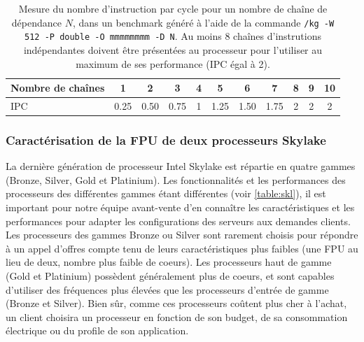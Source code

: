     \begin{table}[h!]
    \centering
    \normalsize
    \begin{tabular}{|l|c|c|c|c|c|c|c|c|c|c|}
    \hline
    Nombre de chaînes & 1 & 2 & 3 & 4 & 5 & 6 & 7 & 8 & 9 & 10 \\ \hline
    IPC & 0.25 & 0.50 & 0.75 & 1 & 1.25 & 1.50 & 1.75 & 2 & 2 & 2 \\ \hline
    \end{tabular}%
    \caption{Mesure du nombre d'instruction par cycle pour un nombre de chaîne de dépendance $N$, dans un benchmark généré à l'aide de la commande \texttt{/kg -W 512 -P double -O mmmmmmmm -D N}. Au moins 8 chaînes d'instrutions indépendantes doivent être présentées au processeur pour l'utiliser au maximum de ses performance (IPC égal à 2).}
    \label{tab_kg_depth}
    \end{table}





    \subsubsection{Caractérisation de la FPU de deux processeurs Skylake}

        La dernière génération de processeur Intel Skylake est répartie en quatre gammes (Bronze, Silver, Gold et Platinium). Les fonctionnalités et les performances des processeurs des différentes gammes étant différentes (voir \autoref{table:skl}), il est important pour notre équipe avant-vente d'en connaître les caractéristiques et les performances pour adapter les configurations des serveurs aux demandes clients. Les processeurs des gammes Bronze ou Silver sont rarement choisis pour répondre à un appel d'offres compte tenu de leurs caractéristiques plus faibles (une FPU au lieu de deux, nombre plus faible de coeurs). Les processeurs haut de gamme (Gold et Platinium) possèdent généralement plus de coeurs, et sont capables d'utiliser des fréquences plus élevées que les processeurs d'entrée de gamme (Bronze et Silver). Bien sûr, comme ces processeurs coûtent plus cher à l'achat, un client choisira un processeur en fonction de son budget, de sa consommation électrique ou du profile de son application.
        
